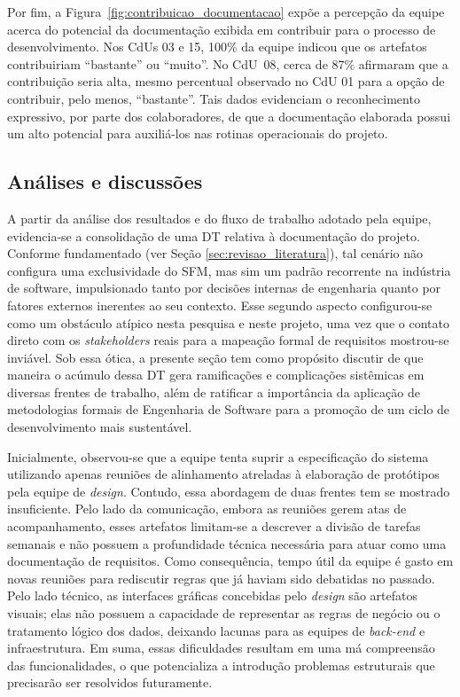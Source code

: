 Por fim, a Figura~\ref{fig:contribuicao_documentacao} expõe a percepção da equipe acerca do potencial da documentação exibida em contribuir para o processo de desenvolvimento. Nos CdUs 03 e 15, 100\% da equipe indicou que os artefatos contribuiriam ``bastante'' ou ``muito''. No CdU~08, cerca de 87\% afirmaram que a contribuição seria alta, mesmo percentual observado no CdU 01 para a opção de contribuir, pelo menos,  ``bastante''. Tais dados evidenciam o reconhecimento expressivo, por parte dos colaboradores, de que a documentação elaborada possui um alto potencial para auxiliá-los nas rotinas operacionais do projeto.

\subsection{Análises e discussões}
\label{sec:analises_discussoes}

A partir da análise dos resultados e do fluxo de trabalho adotado pela equipe, evidencia-se a consolidação de uma DT relativa à documentação do projeto. Conforme fundamentado (ver Seção \ref{sec:revisao_literatura}), tal cenário não configura uma exclusividade do SFM, mas sim um padrão recorrente na indústria de software, impulsionado tanto por decisões internas de engenharia quanto por fatores externos inerentes ao seu contexto. Esse segundo aspecto configurou-se como um obstáculo atípico nesta pesquisa e neste projeto, uma vez que o contato direto com os \textit{stakeholders} reais para a mapeação formal de requisitos mostrou-se inviável. Sob essa ótica, a presente seção tem como propósito discutir de que maneira o acúmulo dessa DT gera ramificações e complicações sistêmicas em diversas frentes de trabalho, além de ratificar a importância da aplicação de metodologias formais de Engenharia de Software para a promoção de um ciclo de desenvolvimento mais sustentável.

Inicialmente, observou-se que a equipe tenta suprir a especificação do sistema utilizando apenas reuniões de alinhamento atreladas à elaboração de protótipos pela equipe de \textit{design}. Contudo, essa abordagem de duas frentes tem se mostrado insuficiente. Pelo lado da comunicação, embora as reuniões gerem atas de acompanhamento, esses artefatos limitam-se a descrever a divisão de tarefas semanais e não possuem a profundidade técnica necessária para atuar como uma documentação de requisitos. Como consequência, tempo útil da equipe é gasto em novas reuniões para rediscutir regras que já haviam sido debatidas no passado. Pelo lado técnico, as interfaces gráficas concebidas pelo \textit{design} são artefatos visuais; elas não possuem a capacidade de representar as regras de negócio ou o tratamento lógico dos dados, deixando lacunas para as equipes de \textit{back-end} e infraestrutura. Em suma, essas dificuldades resultam em uma má compreensão das funcionalidades, o que potencializa a introdução problemas estruturais que precisarão ser resolvidos futuramente.

